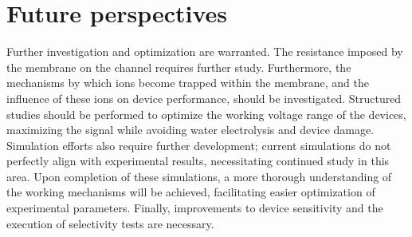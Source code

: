 \section{Future perspectives}

Further investigation and optimization are warranted. The resistance imposed by the membrane on the channel requires further study. Furthermore, the mechanisms by which ions become trapped within the membrane, and the influence of these ions on device performance, should be investigated. Structured studies should be performed to optimize the working voltage range of the devices, maximizing the signal while avoiding water electrolysis and device damage. Simulation efforts also require further development; current simulations do not perfectly align with experimental results, necessitating continued study in this area. Upon completion of these simulations, a more thorough understanding of the working mechanisms will be achieved, facilitating easier optimization of experimental parameters. Finally, improvements to device sensitivity and the execution of selectivity tests are necessary.

\newpage
\thispagestyle{empty}
\ %
\newpage